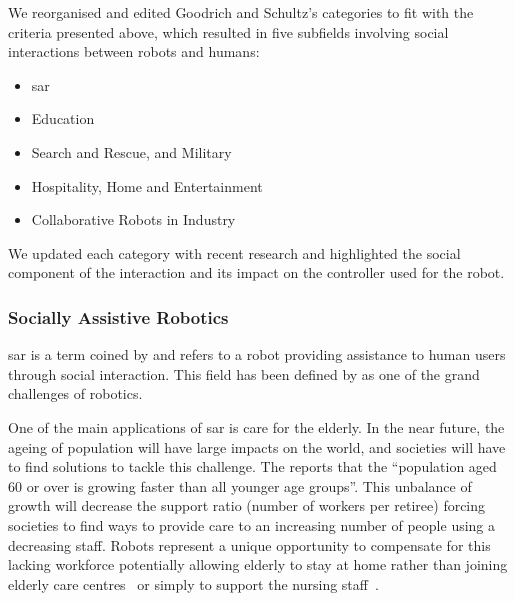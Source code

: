 We reorganised and edited Goodrich and Schultz's categories to fit with the criteria presented above, which resulted in five subfields involving social interactions between robots and humans: 
\begin{itemize}
	\item \acrfull{sar}
	\item Education
	\item Search and Rescue, and Military
	\item Hospitality, Home and Entertainment
	\item Collaborative Robots in Industry
\end{itemize}
We updated each category with recent research and highlighted the social component of the interaction and its impact on the controller used for the robot.

\subsubsection{Socially Assistive Robotics}

	\gls{sar} is a term coined by \cite{feil2005defining} and refers to a robot providing assistance to human users through social interaction. This field has been defined by \cite{tapus2007socially} as one of the grand challenges of robotics.
	
	One of the main applications of \gls{sar} is care for the elderly. In the near future, the ageing of population will have large impacts on the world, and societies will have to find solutions to tackle this challenge. The \cite{united2017world} reports that the ``population aged 60 or over is growing faster than all younger age groups''. This unbalance of growth will decrease the support ratio (number of workers per retiree) forcing societies to find ways to provide care to an increasing number of people using a decreasing staff. Robots represent a unique opportunity to compensate for this lacking workforce potentially allowing elderly to stay at home rather than joining elderly care centres~\citep{di2014web} or simply to support the nursing staff~\citep{wada2004effects}.
	
	
